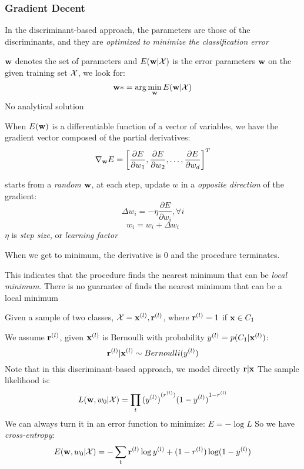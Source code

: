         \subsubsection{Gradient Decent}
    In the discriminant-based approach, the parameters are those of the
        discriminants, and they are \emph{optimized to minimize the
        classification error}
        \begin{description}
    \item[Error]$\mathbf{w}$ denotes the set of parameters and $E(\mathbf{w}|\mathcal{X})$ is the
        error parameters $\mathbf{w}$ on the given training set 
        $\mathcal{X}$, we look for: 
        \[ \mathbf{w}*= \arg\min_{\mathbf{w}}E(\mathbf{w}|\mathcal{X})\]
        No analytical solution
    \item[Gradient Vector] When $E(\mathbf{w})$ is a differentiable function of a
        vector of variables, we have the gradient vector composed of the
           partial derivatives:
            \[ \nabla_{\mathbf{w}} E = {\left[ \frac{\partial E}{\partial w_1},
                \frac{\partial E}{\partial w_2}, \dots, \frac{\partial
                E}{\partial w_d} \right]}^T
                \]
            \item [Gradient Descent] starts from a \emph{random} $\mathbf{w}$, at each
                step, update $w$ in a \emph{opposite direction} of the gradient:
                \[\Delta w_i = - \eta\frac{\partial E}{\partial w_i}, \forall i
                    \]
                \[ w_i = w_i + \Delta w_i \]
                $\eta$ is \emph{step size}, or \emph{learning factor}

                When we get to minimum, the derivative is 0 and the procedure
                terminates.

            \item This indicates that the procedure finds the nearest minimum
                that can be \emph{local minimum}. There is no guarantee of
                finds the nearest minimum that can be a local minimum
    \item [Learning parameters]
        Given a sample of two classes, $\mathcal{X} = {\mathbf{x}^{(l)}, \mathbf{r}^{(l)}}$, where $\mathbf{r}^{(l)}
        = 1$ if $\mathbf{x}\in C_1$

        We assume $\mathbf{r}^{(l)}$, given $\mathbf{x}^{(l)}$ is Bernoulli with probability $y^{(l)} =
        p(C_1|\mathbf{x}^{(l)})$:
        \[\mathbf{r}^{(l)}|\mathbf{x}^{(l)} \sim Bernoulli(y^{(l)}) \]
        Note that in this discriminant-based approach, we model directly $\mathbf{r}|\mathbf{x}$
        The sample likelihood is:
        \[ L(\mathbf{w},w_0|\mathcal{X}) = \prod_t{(y^{(l)})}^{(r^{(l)})}{(1-y^{(l)})}^{1-r^{(l)}}
            \]
        We can always turn it in an error function to minimize: $E = -\log L$
        So we have \emph{cross-entropy}:
        \[ E(\mathbf{w}, w_0| \mathcal{X}) = -\sum_t \mathbf{r}^{(l)}\log y^{(l)} + (1-r^{(l)})\log(1 - y^{(l)}) \]


\end{description}
